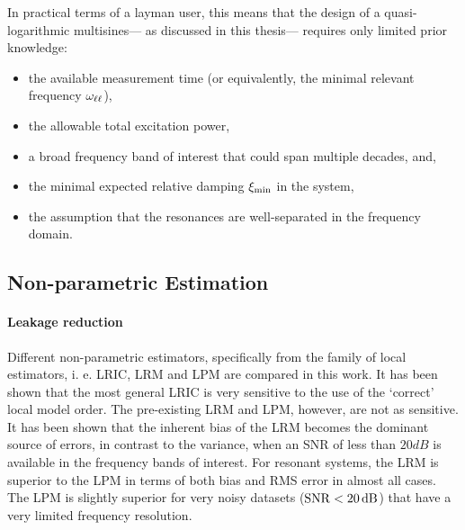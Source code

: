   In practical terms of a layman user, this means that the design of a quasi-logarithmic multisines--- as discussed in this thesis--- requires only limited prior knowledge:
  \begin{itemize}
    \item the available measurement time (or equivalently, the minimal relevant frequency $\omegaLinLog$),
    \item the allowable total excitation power,
    \item a broad frequency band of interest that could span multiple decades, and,\
    \item the minimal expected relative damping $\damping[\min]$ in the system,
    \item the assumption that the resonances are well-separated in the frequency domain.
  \end{itemize}

  \subsection{Non-parametric Estimation}
  
  \paragraph{Leakage reduction}
  Different non-parametric estimators, specifically from the family of local estimators, i. e. \gls{LRIC}, \gls{LRM} and \gls{LPM} are compared in this work.
  It has been shown that the most general \gls{LRIC} is very sensitive to the use of the `correct' local model order.
  The pre-existing \gls{LRM} and \gls{LPM}, however, are not as sensitive.
  It has been shown that the inherent bias of the \gls{LRM} becomes the dominant source of errors, in contrast to the variance, when an \gls{SNR} of less than $20\unit{dB}$ is available in the frequency bands of interest.
  For resonant systems, the \gls{LRM} is superior to the \gls{LPM} in terms of both bias and \gls{RMS} error in almost all cases.
  The \gls{LPM} is slightly superior for very noisy datasets ($\SNR < 20 \unit{dB}$) that have a very limited frequency resolution.

